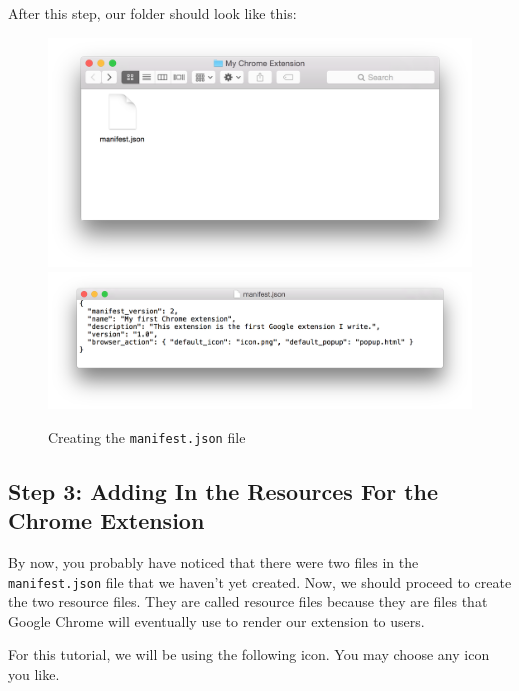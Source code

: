 \documentclass[11pt]{article}
\begin{document}
After this step, our folder should look like this:

	\begin{figure}[htb]
	\centering
	\vspace*{-2em}
	\includegraphics[width=\textwidth]{figures/manifest.png}\vspace*{-2em}
	\hspace*{-2.5em}\includegraphics[width=1.1\textwidth]{figures/saving.png}
	\vspace*{-2em}
	\caption{Creating the \texttt{manifest.json} file\label{fig:saving}}
	\vspace*{1em}
	\end{figure}

\subsection{Step 3: Adding In the Resources For the Chrome Extension}

By now, you probably have noticed that there were two files in the \texttt{manifest.json} file that we haven't yet created. Now, we should proceed to create the two resource files. They are called resource files because they are files that Google Chrome will eventually use to render our extension to users.

For this tutorial, we will be using the following icon. You may choose any icon you like.
\end{document}
